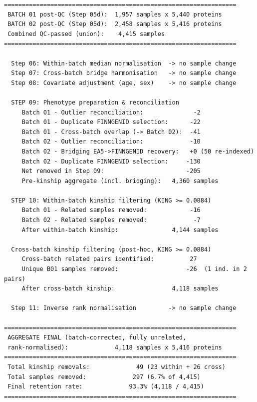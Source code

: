 \documentclass[11pt,a4paper]{article}
\begin{document}
\begin{tcolorbox}[colback=white,colframe=black,boxrule=1pt]
{\scriptsize
\begin{verbatim}
=================================================================
 BATCH 01 post-QC (Step 05d):  1,957 samples x 5,440 proteins
 BATCH 02 post-QC (Step 05d):  2,458 samples x 5,416 proteins
 Combined QC-passed (union):    4,415 samples
=================================================================

  Step 06: Within-batch median normalisation  -> no sample change
  Step 07: Cross-batch bridge harmonisation   -> no sample change
  Step 08: Covariate adjustment (age, sex)    -> no sample change

  STEP 09: Phenotype preparation & reconciliation
     Batch 01 - Outlier reconciliation:              -2
     Batch 01 - Duplicate FINNGENID selection:      -22
     Batch 01 - Cross-batch overlap (-> Batch 02):  -41
     Batch 02 - Outlier reconciliation:             -10
     Batch 02 - Bridging EA5->FINNGENID recovery:   +0 (50 re-indexed)
     Batch 02 - Duplicate FINNGENID selection:     -130
     Net removed in Step 09:                       -205
     Pre-kinship aggregate (incl. bridging):   4,360 samples

  STEP 10: Within-batch kinship filtering (KING >= 0.0884)
     Batch 01 - Related samples removed:            -16
     Batch 02 - Related samples removed:             -7
     After within-batch kinship:               4,144 samples

  Cross-batch kinship filtering (post-hoc, KING >= 0.0884)
     Cross-batch related pairs identified:          27
     Unique B01 samples removed:                   -26  (1 ind. in 2 pairs)
     After cross-batch kinship:                4,118 samples

  Step 11: Inverse rank normalisation         -> no sample change

=================================================================
 AGGREGATE FINAL (batch-corrected, fully unrelated,
 rank-normalised):             4,118 samples x 5,416 proteins
=================================================================
 Total kinship removals:             49 (23 within + 26 cross)
 Total samples removed:             297 (6.7% of 4,415)
 Final retention rate:             93.3% (4,118 / 4,415)
=================================================================
\end{verbatim}
}
\end{tcolorbox}
\end{document}
